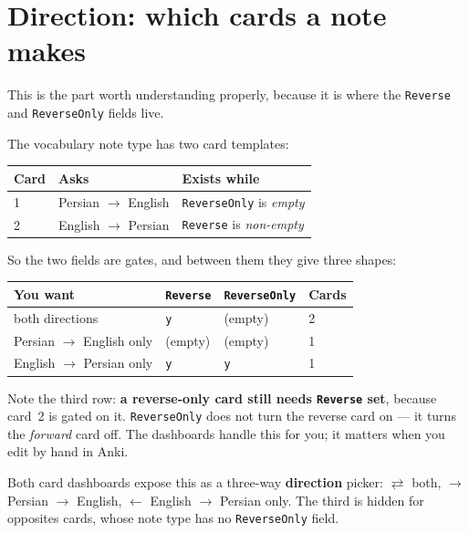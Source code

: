 \documentclass[11pt,oneside]{report}
\newcommand{\menu}[1]{\textsf{#1}}
\begin{document}
\section{Direction: which cards a note makes}
\label{sec:direction}

This is the part worth understanding properly, because it is where the
\texttt{Reverse} and \texttt{ReverseOnly} fields live.

The vocabulary note type has two card templates:

\begin{center}
\begin{tabular}{@{}lll@{}}
\toprule
\textsf{Card} & \textsf{Asks} & \textsf{Exists while} \\
\midrule
1 & Persian $\rightarrow$ English & \texttt{ReverseOnly} is \emph{empty} \\
2 & English $\rightarrow$ Persian & \texttt{Reverse} is \emph{non-empty} \\
\bottomrule
\end{tabular}
\end{center}

So the two fields are gates, and between them they give three shapes:

\begin{center}
\begin{tabular}{@{}llll@{}}
\toprule
\textsf{You want} & \texttt{Reverse} & \texttt{ReverseOnly} & \textsf{Cards} \\
\midrule
both directions            & \texttt{y} & (empty)    & 2 \\
Persian $\rightarrow$ English only & (empty)    & (empty)    & 1 \\
English $\rightarrow$ Persian only & \texttt{y} & \texttt{y} & 1 \\
\bottomrule
\end{tabular}
\end{center}

Note the third row: \textbf{a reverse-only card still needs
\texttt{Reverse} set}, because card~2 is gated on it. \texttt{ReverseOnly}
does not turn the reverse card on --- it turns the \emph{forward} card off.
The dashboards handle this for you; it matters when you edit by hand in
Anki.

Both card dashboards expose this as a three-way \textbf{direction} picker:
\menu{\(\rightleftarrows\) both}, \menu{$\rightarrow$ Persian $\rightarrow$
English}, \menu{$\leftarrow$ English $\rightarrow$ Persian only}. The third
is hidden for opposites cards, whose note type has no \texttt{ReverseOnly}
field.
\end{document}
